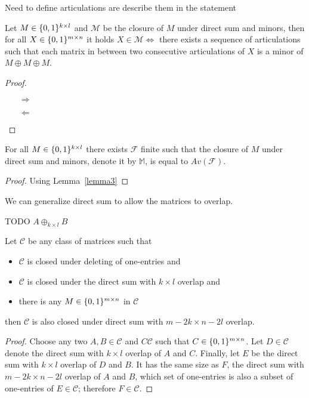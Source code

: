 Need to define articulations are describe them in the statement
\begin{lemma}
\label{lemma3}
Let $M\in\{0,1\}^{k\times l}$ and $\mathcal{M}$ be the closure of $M$ under direct sum and minors, then for all $X\in\{0,1\}^{m\times n}$ it holds $X\in\mathcal{M}\Leftrightarrow$ there exists a sequence of articulations such that each matrix in between two consecutive articulations of $X$ is a minor of $M\oplus M\oplus M$.  
\end{lemma}
\begin{proof}
\begin{itemize}
\item[$\Rightarrow$]
\item[$\Leftarrow$]
\end{itemize}
\end{proof}
\begin{thm}
For all $M\in\{0,1\}^{k\times l}$ there exists $\mathcal{F}$ finite such that the closure of $M$ under direct sum and minors, denote it by $\mathbb{M}$, is equal to $Av(\mathcal{F})$.
\end{thm}
\begin{proof}
Using Lemma~\ref{lemma3}
\end{proof}
We can generalize direct sum to allow the matrices to overlap.
\begin{defn}
TODO $A\oplus_{k\times l}B$
\end{defn}
\begin{thm}
Let $\mathcal{C}$ be any class of matrices such that
\begin{itemize}
\item $\mathcal{C}$ is closed under deleting of one-entries and
\item $\mathcal{C}$ is closed under the direct sum with $k\times l$ overlap and
\item there is any $M\in\{0,1\}^{m\times n}$ in $\mathcal{C}$
\end{itemize}
then $\mathcal{C}$ is also closed under direct sum with $m-2k\times n-2l$ overlap.
\end{thm}
\begin{proof}
Choose any two $A,B\in\mathcal{C}$ and $C\mathcal{C}$ such that $C\in\{0,1\}^{m\times n}$. Let $D\in\mathcal{C}$ denote the direct sum with $k\times l$ overlap of $A$ and $C$. Finally, let $E$ be the direct sum with $k\times l$ overlap of $D$ and $B$. It has the same size as $F$, the direct sum with $m-2k\times n-2l$ overlap of $A$ and $B$, which set of one-entries is also a subset of one-entries of $E\in\mathcal{C}$; therefore $F\in\mathcal{C}$.
\end{proof}
